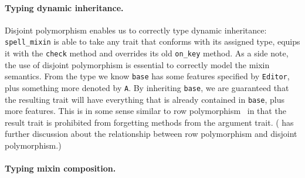 \paragraph{Typing dynamic inheritance.}

Disjoint polymorphism enables us to correctly type dynamic inheritance:
\lstinline{spell_mixin} is able to take any trait that conforms with its
assigned type, equips it with the \lstinline{check} method and overrides its
old \lstinline{on_key} method. As a side note, the use of disjoint polymorphism
is essential to correctly model the mixin semantics. From the type we know
\lstinline{base} has some features specified by \lstinline{Editor}, plus
something more denoted by \lstinline{A}. By inheriting \lstinline{base}, we are
guaranteed that the resulting trait will have everything that is already contained
in \lstinline{base}, plus more features. This is in some sense similar to row
polymorphism~\citep{wand1994type} in that the result trait is prohibited from
forgetting methods from the argument trait. ( has further discussion about the relationship
between row polymorphism and disjoint polymorphism.)


\paragraph{Typing mixin composition.}

